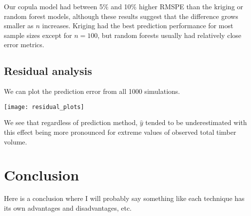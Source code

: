 \documentclass{article}
\begin{document}
Our copula model had between 5\% and 10\% higher RMSPE than the kriging or random forest models, although these results suggest that the difference grows smaller as $n$ increases.
Kriging had the best prediction performance for most sample sizes except for $n = 100$, but random forests usually had relatively close error metrics.

\subsection{Residual analysis}

We can plot the prediction error from all 1000 simulations.

\begin{center}
\texttt{[image: residual\_plots]}
\end{center}

We see that regardless of prediction method, $\hat{y}$ tended to be underestimated with this effect being more pronounced for extreme values of observed total timber volume.

\section{Conclusion}
Here is a conclusion where I will probably say something like each technique has its own advantages and disadvantages, etc.

\printbibliography
\end{document}
